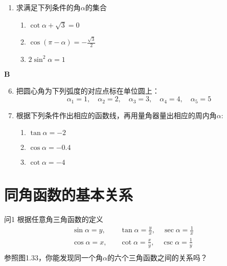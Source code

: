 \begin{enumerate}
\item 求满足下列条件的角$\alpha$的集合
\begin{multicols}{2}
\begin{enumerate}[(1)]
    \item $\cot\alpha+\sqrt{3}=0$
    \item $\cos(\pi-\alpha)=-\frac{\sqrt{3}}{2}$
    \item $2\sin^2\alpha =1$
\end{enumerate}
\end{multicols}
\end{enumerate}

\begin{center}
    \bfseries B
\end{center}

\begin{enumerate}\setcounter{enumi}{5}
    \item 把圆心角为下列弧度的对应点标在单位圆上：
    $$\alpha _{1}= 1,\quad \alpha _{2}= 2,\quad \alpha _{3}= 3,\quad \alpha _{4}= 4,\quad \alpha _{5}= 5$$
    \item 根据下列条件作出相应的函数线，再用量角器量出相应的周内角$\alpha$:
\begin{multicols}{3}
\begin{enumerate}[(1)]
    \item $\tan\alpha=-2$
    \item $\cos\alpha=-0.4$
    \item $\cot\alpha=-4$
\end{enumerate}
\end{multicols}
\end{enumerate}

\section{同角函数的基本关系}
\begin{thm}
    {问1}
    根据任意角三角函数的定义
\[\begin{split}
    \sin\alpha=y,&\quad \tan\alpha=\frac{y}{x},\quad \sec\alpha=\frac{1}{x}\\
\cos\alpha=x,&\quad \cot\alpha=\frac{x}{y},\quad \csc\alpha=\frac{1}{y}\\
\end{split}\]
参照图1.33，你能发现同一个角$\alpha$的六个三角函数之间的关系吗？
\end{thm}

